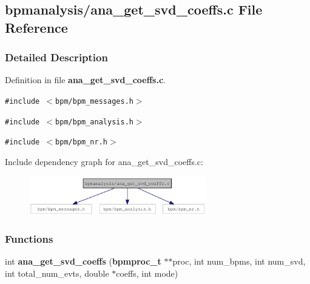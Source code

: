 \subsection{bpmanalysis/ana\_\-get\_\-svd\_\-coeffs.c File Reference}
\label{ana__get__svd__coeffs_8c}


\subsubsection{Detailed Description}


Definition in file {\bf ana\_\-get\_\-svd\_\-coeffs.c}.

{\tt \#include $<$bpm/bpm\_\-messages.h$>$}\par
{\tt \#include $<$bpm/bpm\_\-analysis.h$>$}\par
{\tt \#include $<$bpm/bpm\_\-nr.h$>$}\par


Include dependency graph for ana\_\-get\_\-svd\_\-coeffs.c:\nopagebreak
\begin{figure}[H]
\begin{center}
\leavevmode
\includegraphics[width=219pt]{ana__get__svd__coeffs_8c__incl}
\end{center}
\end{figure}
\subsubsection*{Functions}
\begin{CompactItemize}
\item 
int {\bf ana\_\-get\_\-svd\_\-coeffs} ({\bf bpmproc\_\-t} $\ast$$\ast$proc, int num\_\-bpms, int num\_\-svd, int total\_\-num\_\-evts, double $\ast$coeffs, int mode)
\end{CompactItemize}
